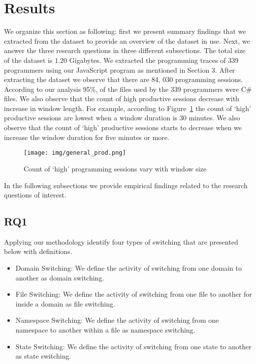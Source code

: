 \section{Results}

We organize this section as following: first we present summary findings that we extracted from the dataset to provide an overview of the dataset in use. Next, we answer the three research questions in three different subsections. 
The total size of the dataset is 1.20 Gigabytes. We extracted the programming traces of 339 programmers using our JavaScript program as mentioned in Section 3. After extracting the dataset we observe that there are 84, 030 programming sessions. 
According to our analysis 95\%, of the files used by the 339 programmers were C\# files.   
We also observe that the count of high productive sessions decrease with increase in window length. For example, according to Figure~\ref{high_prod_sess} the count of `high' productive sessions are lowest when a window duration is 30 minutes. We also observe that the count of `high' productive sessions starts to decrease when we increase the window duration for five minutes or more. 

\begin{figure}[htbp]
\centering
\texttt{[image: img/general\_prod.png]}
\caption{Count of `high' programming sessions vary with window size}
\label{high_prod_sess}
\end{figure}

In the following subsections we provide empirical findings related to the research questions of interest.  
\subsection{RQ1}
Applying our methodology identify four types of switching that are presented below with definitions.
\begin{itemize}
\item{Domain Switching: We define the activity of switching from one domain to another as domain switching.}
\item{File Switching: We define the activity of switching from one file to another for inside a domain as file switching.}
\item{Namespace Switching: We define the activity of switching from one namespace to another within a file as namespace switching.}
\item{State Switching: We define the activity of switching from one state to another as state switching.}
\end{itemize}

